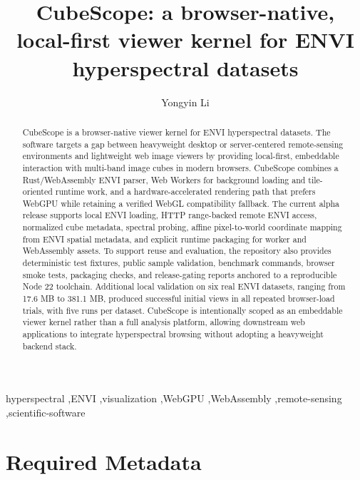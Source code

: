 \documentclass[preprint,12pt,a4paper]{elsarticle}
\begin{document}
\renewcommand{\labelenumii}{\arabic{enumi}.\arabic{enumii}}

\begin{frontmatter}

\title{CubeScope: a browser-native, local-first viewer kernel for ENVI hyperspectral datasets}

\author{Yongyin Li}
\address{107 Geological Team, Chongqing Bureau of Geology and Mineral Development, Chongqing 401120, People's Republic of China. Tel.: +86 18883420592}

\begin{abstract}
CubeScope is a browser-native viewer kernel for ENVI hyperspectral datasets.
The software targets a gap between heavyweight desktop or server-centered
remote-sensing environments and lightweight web image viewers by providing
local-first, embeddable interaction with multi-band image cubes in modern
browsers. CubeScope combines a Rust/WebAssembly ENVI parser, Web Workers for
background loading and tile-oriented runtime work, and a hardware-accelerated
rendering path that prefers WebGPU while retaining a verified WebGL
compatibility fallback. The current alpha release supports local ENVI loading,
HTTP range-backed remote ENVI access, normalized cube metadata, spectral
probing, affine pixel-to-world coordinate mapping from ENVI spatial metadata,
and explicit runtime packaging for worker and WebAssembly assets. To support
reuse and evaluation, the repository also provides deterministic test fixtures,
public sample validation, benchmark commands, browser smoke tests, packaging
checks, and release-gating reports anchored to a reproducible Node 22
toolchain. Additional local validation on six real ENVI datasets, ranging from
17.6 MB to 381.1 MB, produced successful initial views in all repeated
browser-load trials, with five runs per dataset. CubeScope is intentionally
scoped as an embeddable viewer kernel rather than a full analysis platform,
allowing downstream web applications to integrate hyperspectral browsing
without adopting a heavyweight backend stack.
\end{abstract}

\begin{keyword}
hyperspectral \sep ENVI \sep visualization \sep WebGPU \sep WebAssembly \sep remote-sensing \sep scientific-software
\end{keyword}

\end{frontmatter}

\section*{Required Metadata}
\end{document}
